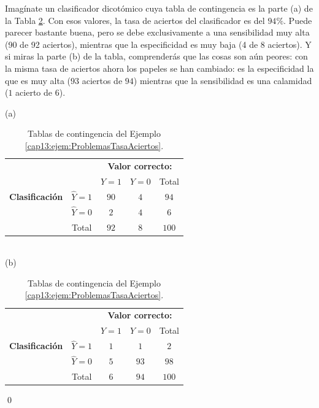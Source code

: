 \begin{ejemplo}
	\label{cap13:ejem:ProblemasTasaAciertos}
Imagínate un clasificador dicotómico cuya tabla de contingencia es la parte (a) de la Tabla \ref{cap13:tabla:ProblemasTasaAciertos}.  Con esos valores, la tasa de aciertos del clasificador es del $94\%$. Puede parecer bastante buena, pero se debe exclusivamente a una sensibilidad muy alta (90 de 92 aciertos), mientras que la especificidad es muy baja (4 de 8 aciertos). Y si miras la parte (b) de la tabla, comprenderás que las cosas son aún peores: con la misma tasa de aciertos ahora los papeles se han cambiado: es la especificidad la que es muy alta ($93$ aciertos de $94$) mientras que la sensibilidad es una calamidad ($1$ acierto de $6$).

\begin{table}[ht]
	\begin{center}
		(a)\quad
		\begin{tabular}{cc|c|c|c|}
			&\multicolumn{1}{c}{}&\multicolumn{3}{c}{\bf Valor correcto:}\\
			\cline{3-5}
			&\multicolumn{1}{c|}{}& $Y = 1$&  $Y = 0$& Total \\
			\cline{2-5}
			{\bf Clasificación}&\multicolumn{1}{|c|}{\rule{0cm}{0.5cm}$\hat{Y} = 1$}& $90$ & $4$ & $94$ \\
			\cline{2-5}
			& \multicolumn{1}{|c|}{\rule{0cm}{0.5cm}$\hat{Y} = 0$ }& $2$ & $4$ &  $6$\\
			\cline{2-5}
			& \multicolumn{1}{|c|}{Total} & $92$ & $8$ & $100$ \\
			\cline{2-5}
		\end{tabular}
		\\[5mm]
		(b)\quad
		\begin{tabular}{cc|c|c|c|}
			&\multicolumn{1}{c}{}&\multicolumn{3}{c}{\bf Valor correcto:}\\
			\cline{3-5}
			&\multicolumn{1}{c|}{}& $Y = 1$&  $Y = 0$& Total \\
			\cline{2-5}
			{\bf Clasificación}&\multicolumn{1}{|c|}{\rule{0cm}{0.5cm}$\hat{Y} = 1$}& $1$ & $1$ & $2$ \\
			\cline{2-5}
			& \multicolumn{1}{|c|}{\rule{0cm}{0.5cm}$\hat{Y} = 0$ }& $5$ & $93$ &  $98$\\
			\cline{2-5}
			& \multicolumn{1}{|c|}{Total} & $6$ & $94$ & $100$ \\
			\cline{2-5}
		\end{tabular}		
	\end{center}
	\caption{Tablas de contingencia del Ejemplo \ref{cap13:ejem:ProblemasTasaAciertos}.}
	\label{cap13:tabla:ProblemasTasaAciertos}
\end{table}

\qed		
\end{ejemplo}
